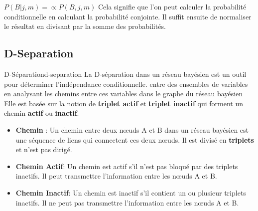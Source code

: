 \begin{remark}\leavevmode
    $P(B | j, m) = \propto P(B, j, m)$
    Cela signifie que l'on peut calculer la probabilité conditionnelle en calculant la probabilité conjointe.
    Il suffit ensuite de normaliser le résultat en divisant par la somme des probabilités.
\end{remark}


\subsection{D-Separation} %
\label{sub:d_separation}

\begin{definition}{D-Séparation}{d-separation}
    La D-séparation dans un réseau bayésien est un outil pour déterminer l'indépendance conditionnelle.
    entre des ensembles de variables en analysant les chemins entre ces variables dans le graphe du réseau bayésien
    Elle est basée sur la notion de \textbf{triplet actif} et \textbf{triplet inactif} qui forment un chemin \textbf{actif} ou \textbf{inactif}.
    \begin{itemize}
        \item \textbf{Chemin} : Un chemin entre deux nœuds A et B dans un réseau bayésien est une séquence de liens qui connectent ces deux nœuds. Il est divisé en \textbf{triplets} et n'est pas dirigé.
        \item \textbf{Chemin Actif}:  Un chemin est actif s'il n'est pas bloqué par des triplets inactifs. Il peut transmettre l'information entre les nœuds A et B.
        \item \textbf{Chemin Inactif}: Un chemin est inactif s'il contient un ou plusieur triplets inactifs. Il ne peut pas transmettre l'information entre les nœuds A et B.
    \end{itemize}
\end{definition}

